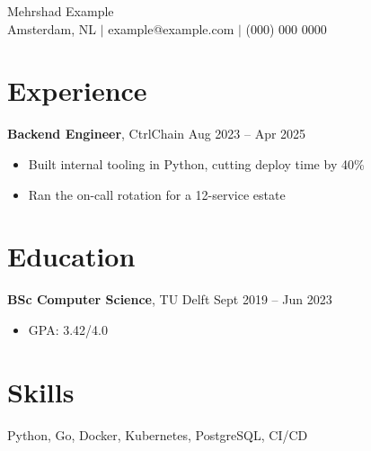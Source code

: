 \documentclass[10pt, letterpaper]{article}
\begin{document}
\begin{center}
    {\Huge Mehrshad Example}\\
    \vspace{2pt}
    Amsterdam, NL $|$ example@example.com $|$ (000) 000 0000
\end{center}

\section{Experience}
\textbf{Backend Engineer}, CtrlChain \hfill Aug 2023 -- Apr 2025
\begin{itemize}[leftmargin=*]
    \item Built internal tooling in Python, cutting deploy time by 40\%
    \item Ran the on-call rotation for a 12-service estate
\end{itemize}

\section{Education}
\textbf{BSc Computer Science}, TU Delft \hfill Sept 2019 -- Jun 2023
\begin{itemize}[leftmargin=*]
    \item GPA: 3.42/4.0
\end{itemize}

\section{Skills}
Python, Go, Docker, Kubernetes, PostgreSQL, CI/CD
\end{document}
